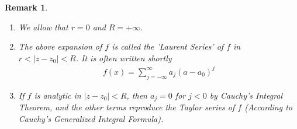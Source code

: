 \documentclass[12pt, a4paper]{article}
\theoremstyle{plain}
\newtheorem{rem}{Remark}
\theoremstyle{definition}
\begin{document}
		\begin{rem}
			\begin{enumerate}
				\item We allow that $r=0$ and $R=+\infty$.
				\item The above expansion of $f$ is called the 'Laurent Series' of $f$ in $r<|z-z_0|<R$. It is often written shortly
				\begin{align*}
					f(x) = \sum\limits_{j=-\infty}^{\infty}a_j(a-a_0)^j
				\end{align*}
				\item If $f$ is analytic in $|z-z_0|<R$, then $a_j=0$ for $j<0$ by Cauchy's Integral Theorem, and the other terms reproduce the Taylor series of $f$ (According to Cauchy's Generalized Integral Formula).\\
			\end{enumerate}
		\end{rem}
\end{document}
